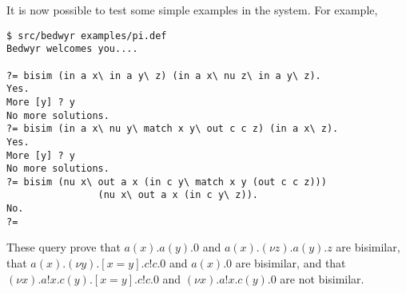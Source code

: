 \documentclass{article}
\begin{document}
It is now possible to test some simple examples in the system.  For
example,
\begin{verbatim}
$ src/bedwyr examples/pi.def
Bedwyr welcomes you....

?= bisim (in a x\ in a y\ z) (in a x\ nu z\ in a y\ z).
Yes.
More [y] ? y
No more solutions.
?= bisim (in a x\ nu y\ match x y\ out c c z) (in a x\ z).
Yes.
More [y] ? y
No more solutions.
?= bisim (nu x\ out a x (in c y\ match x y (out c c z)))
                (nu x\ out a x (in c y\ z)).
No.
?= 
\end{verbatim}
These query prove that 
$a(x).a(y).0$ and $a(x).(\nu z).a(y).z$ are bisimilar, 
that
$a(x).(\nu y).[x=y].c!c.0$ and $a(x).0$ are bisimilar, and that 
$(\nu x).a!x.c(y).[x=y].c!c.0$ and 
$(\nu x).a!x.c(y).0$ are not bisimilar.



%
\end{document}
